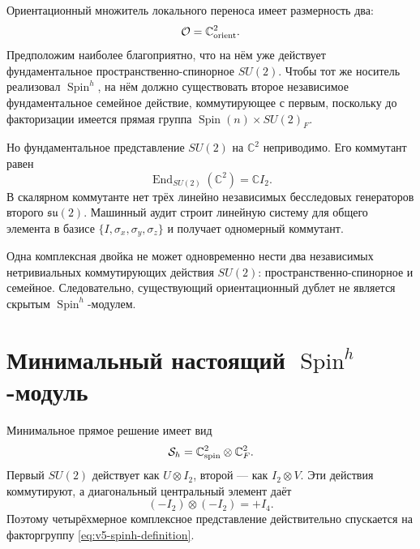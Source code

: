 Ориентационный множитель локального переноса имеет размерность два:
\begin{equation}
 \mathcal O=\mathbb C^2_{\rm orient}.
\end{equation}
Предположим наиболее благоприятно, что на нём уже действует
фундаментальное пространственно-спинорное $SU(2)$. Чтобы тот же носитель
реализовал $\operatorname{Spin}^h$, на нём должно существовать второе
независимое фундаментальное семейное действие, коммутирующее с первым,
поскольку до факторизации имеется прямая группа
$\operatorname{Spin}(n)\times SU(2)_F$.

Но фундаментальное представление $SU(2)$ на $\mathbb C^2$ неприводимо.
Его коммутант равен
\begin{equation}
 \operatorname{End}_{SU(2)}(\mathbb C^2)=\mathbb C I_2.
 \label{eq:v5-spinh-c2-commutant}
\end{equation}
В скалярном коммутанте нет трёх линейно независимых бесследовых
генераторов второго $\mathfrak{su}(2)$. Машинный аудит строит линейную
систему для общего элемента в базисе
$\{I,\sigma_x,\sigma_y,\sigma_z\}$ и получает одномерный коммутант.

\begin{theorem}
Одна комплексная двойка не может одновременно нести два независимых
нетривиальных коммутирующих действия $SU(2)$: пространственно-спинорное и
семейное. Следовательно, существующий ориентационный дублет не является
скрытым $\operatorname{Spin}^h$-модулем.
\end{theorem}

\section{Минимальный настоящий
\texorpdfstring{$\operatorname{Spin}^h$}{Spin-h}-модуль}

Минимальное прямое решение имеет вид
\begin{equation}
 \mathcal S_h=
 \mathbb C^2_{\rm spin}\otimes\mathbb C^2_F.
 \label{eq:v5-spinh-minimal-module}
\end{equation}
Первый $SU(2)$ действует как $U\otimes I_2$, второй --- как
$I_2\otimes V$. Эти действия коммутируют, а диагональный центральный
элемент даёт
\begin{equation}
 (-I_2)\otimes(-I_2)=+I_4.
 \label{eq:v5-spinh-center-cancellation}
\end{equation}
Поэтому четырёхмерное комплексное представление действительно спускается
на факторгруппу \eqref{eq:v5-spinh-definition}.

